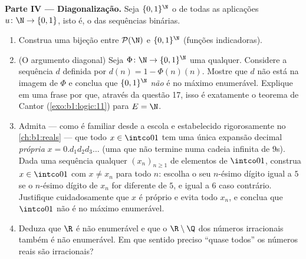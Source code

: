 \begin{problem}
\medskip
\noindent\textbf{Parte IV --- Diagonalização.} Seja $\{0,1\}^{\N}$
o  de todas as aplicações $u \colon \N \to \{0, 1\}$, isto é, o 
das sequências binárias.
\begin{enumerate}
  \item Construa uma bijeção entre $\mathcal{P}(\N)$ e
        $\{0,1\}^{\N}$ (funções indicadoras).
  \item (O argumento diagonal) Seja $\Phi \colon \N \to
        \{0,1\}^{\N}$ uma  qualquer. Considere a sequência $d$ definida
        por $d(n) = 1 - \Phi(n)(n)$. Mostre que $d$ não está na
        imagem de $\Phi$ e conclua que $\{0,1\}^{\N}$ \emph{não} é
        no máximo enumerável. Explique em uma frase por que,
        através da questão 17, isso é exatamente o teorema de Cantor
        (\cref{exo:b1:logic:11}) para $E = \N$.
  \item Admita --- como é familiar desde a escola e estabelecido
        rigorosamente no \cref{ch:b1:reals} --- que todo $x \in
        \intco01$ tem uma única expansão decimal \emph{própria} $x =
        0.d_1 d_2 d_3\dots$ (uma que não termine numa cadeia infinita de
        $9$s). Dada uma sequência qualquer $(x_n)_{n \geq 1}$ de elementos de
        $\intco01$, construa $x \in \intco01$ com $x \neq x_n$ para
        todo $n$: escolha o seu $n$-ésimo dígito igual a $5$ se o
        $n$-ésimo dígito de $x_n$ for diferente de $5$, e igual a $6$ caso
        contrário. Justifique cuidadosamente que $x$ é próprio e evita
        todo $x_n$, e conclua que $\intco01$ não é no máximo enumerável.
  \item Deduza que $\R$ é não enumerável e que o  $\R
        \setminus \Q$ dos números irracionais também é não enumerável.
        Em que sentido preciso ``quase todos'' os números reais são
        irracionais?
\end{enumerate}


\end{problem}
